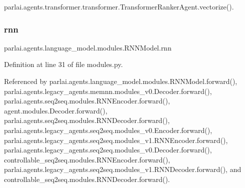 parlai.\+agents.\+transformer.\+transformer.\+Transformer\+Ranker\+Agent.\+vectorize().

\mbox{\label{classparlai_1_1agents_1_1language__model_1_1modules_1_1RNNModel_a961b0bd4d15bf0d858998e70eaf22f1d}} 
\subsubsection{\texorpdfstring{rnn}{rnn}}
{\footnotesize\ttfamily parlai.\+agents.\+language\+\_\+model.\+modules.\+R\+N\+N\+Model.\+rnn}



Definition at line 31 of file modules.\+py.



Referenced by parlai.\+agents.\+language\+\_\+model.\+modules.\+R\+N\+N\+Model.\+forward(), parlai.\+agents.\+legacy\+\_\+agents.\+memnn.\+modules\+\_\+v0.\+Decoder.\+forward(), parlai.\+agents.\+seq2seq.\+modules.\+R\+N\+N\+Encoder.\+forward(), agent.\+modules.\+Decoder.\+forward(), parlai.\+agents.\+seq2seq.\+modules.\+R\+N\+N\+Decoder.\+forward(), parlai.\+agents.\+legacy\+\_\+agents.\+seq2seq.\+modules\+\_\+v0.\+Encoder.\+forward(), parlai.\+agents.\+legacy\+\_\+agents.\+seq2seq.\+modules\+\_\+v1.\+R\+N\+N\+Encoder.\+forward(), parlai.\+agents.\+legacy\+\_\+agents.\+seq2seq.\+modules\+\_\+v0.\+Decoder.\+forward(), controllable\+\_\+seq2seq.\+modules.\+R\+N\+N\+Encoder.\+forward(), parlai.\+agents.\+legacy\+\_\+agents.\+seq2seq.\+modules\+\_\+v1.\+R\+N\+N\+Decoder.\+forward(), and controllable\+\_\+seq2seq.\+modules.\+R\+N\+N\+Decoder.\+forward().

\mbox{\label{classparlai_1_1agents_1_1language__model_1_1modules_1_1RNNModel_ac277c84d2fe07dfcf0f629d321c7316a}} 
